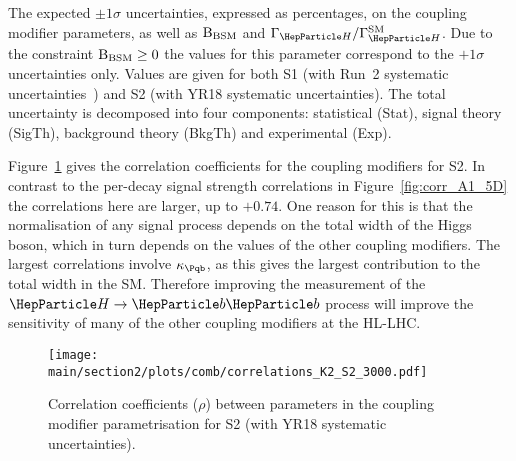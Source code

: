 \begin{table}[hbtp]
\centering
\caption{The expected $\pm 1\sigma$ uncertainties, expressed as percentages, on the coupling modifier parameters, as well as $\mathrm{B_{BSM}}$ and $\GammaSM$. Due to the constraint $\mathrm{B_{BSM}} \geq 0$ the values for this parameter correspond to the $+1\sigma$ uncertainties only.  Values are given for both S1 (with Run~2 systematic uncertainties~\cite{Sirunyan:2018koj}) and S2 (with YR18 systematic uncertainties). The total uncertainty is decomposed into four components: statistical (Stat), signal theory (SigTh), background theory (BkgTh) and experimental (Exp).}

\label{tab:summary_K2}
\vspace{0.5cm}
\end{table}

Figure~\ref{fig:corr_K2} gives the correlation coefficients for the coupling modifiers for S2. In contrast to the per-decay signal strength correlations in Figure~\ref{fig:corr_A1_5D} the correlations here are larger, up to $+0.74$. One reason for this is that the normalisation of any signal process depends on the total width of the Higgs boson, which in turn depends on the values of the other coupling modifiers. The largest correlations involve $\kb$, as this gives the largest contribution to the total width in the SM. Therefore improving the measurement of the $\hbb$ process will improve the sensitivity of many of the other coupling modifiers at the HL-LHC.

\begin{figure}[hbtp]
\centering
\texttt{[image: \\main/section2/plots/comb/correlations\_K2\_S2\_3000.pdf]}%
\caption{Correlation coefficients ($\rho$) between parameters in the coupling modifier parametrisation for S2 (with YR18 systematic uncertainties).}
\label{fig:corr_K2}
\end{figure}

